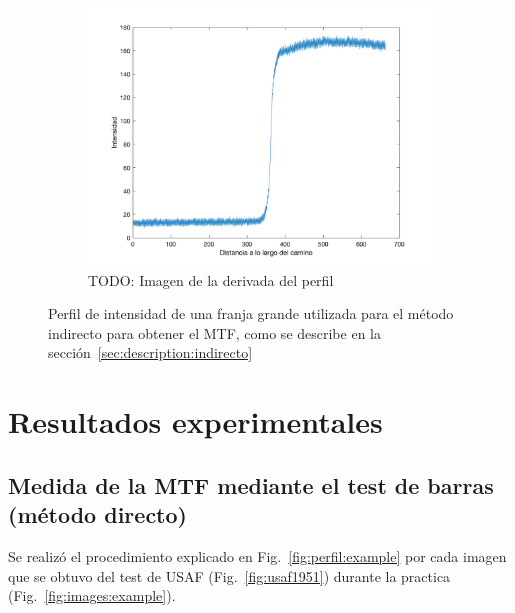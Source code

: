 \documentclass{./packages/optica-article}
\begin{document}
\begin{figure}[hptb]
\begin{subfigure}[t]{0.31\textwidth}
		\includegraphics[width=\textwidth]{edge_perfil}
		\caption{TODO: Imagen de la derivada del perfil}
		\label{fig:perfil:lsf}
	\end{subfigure}
	
	\caption{Perfil de intensidad de una franja grande utilizada para el método indirecto para obtener el MTF, como se describe en la sección~\ref{sec:description:indirecto}}
	\label{fig:perfil}
\end{figure}

\section{Resultados experimentales}\label{sec:resultados}

\subsection{Medida de la MTF mediante el test de barras (método directo)}\label{sec:resultados:directo}
Se realizó el procedimiento explicado en Fig.~\ref{fig:perfil:example} por cada imagen que se obtuvo del test de USAF (Fig.~\ref{fig:usaf1951}) durante la practica (Fig.~\ref{fig:images:example}).
\end{document}
